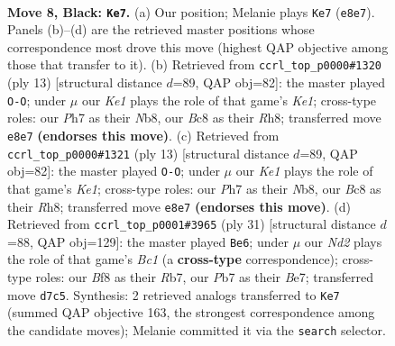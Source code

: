 \documentclass[11pt]{article}
\begin{document}
\begin{figure}[p]\centering
\begin{subfigure}{0.46\textwidth}\centering
\resizebox{\linewidth}{!}{%
\newchessgame
\chessboard[
  setfen={r1bqkb1r/pp1n1ppp/2n1p3/3pP3/3P2Q1/3B4/PP1N1PPP/R1B1K1NR b KQkq - 0 8},
  showmover=false,
  pgfstyle=straightmove, color=movearrow, markmove={e8-e7}
]}
\caption{}
\end{subfigure}\hfill
\begin{subfigure}{0.46\textwidth}\centering
\resizebox{\linewidth}{!}{%
\newchessgame
\chessboard[
  setfen={rnbqk2r/pp2nppp/4p3/2ppP3/3P2Q1/P1P5/2P2PPP/R1B1KBNR b KQkq - 2 7},
  showmover=false,
  pgfstyle=straightmove, color=movearrow, markmove={e8-g8}
]}
\caption{}
\end{subfigure}
\\[4pt]
\begin{subfigure}{0.46\textwidth}\centering
\resizebox{\linewidth}{!}{%
\newchessgame
\chessboard[
  setfen={rnbqk2r/pp2nppp/4p3/2ppP3/3P2Q1/P1P5/2P2PPP/R1B1KBNR b KQkq - 2 7},
  showmover=false,
  pgfstyle=straightmove, color=movearrow, markmove={e8-g8}
]}
\caption{}
\end{subfigure}\hfill
\begin{subfigure}{0.46\textwidth}\centering
\resizebox{\linewidth}{!}{%
\newchessgame
\chessboard[
  setfen={2bqk2r/1r2bpp1/p2p1n1p/4p3/1p2P1P1/4BP2/PPPQN2P/1K1R1B1R b k - 3 16},
  showmover=false,
  pgfstyle=straightmove, color=movearrow, markmove={c8-e6}
]}
\caption{}
\end{subfigure}
\caption{\textbf{Move 8, Black: \texttt{Ke7}.} (a) Our position; Melanie plays \texttt{Ke7} (\texttt{e8e7}). Panels (b)--(d) are the retrieved master positions whose correspondence most drove this move (highest QAP objective among those that transfer to it). (b) Retrieved from \texttt{ccrl\_top\_p0000\#1320} (ply 13) [structural distance $d$=89, QAP obj=82]: the master played \texttt{O-O}; under $\mu$ our \emph{Ke1} plays the role of that game's \emph{Ke1}; cross-type roles: our \emph{P}h7 as their \emph{N}b8, our \emph{B}c8 as their \emph{R}h8; transferred move \texttt{e8e7} \textbf{(endorses this move)}. (c) Retrieved from \texttt{ccrl\_top\_p0000\#1321} (ply 13) [structural distance $d$=89, QAP obj=82]: the master played \texttt{O-O}; under $\mu$ our \emph{Ke1} plays the role of that game's \emph{Ke1}; cross-type roles: our \emph{P}h7 as their \emph{N}b8, our \emph{B}c8 as their \emph{R}h8; transferred move \texttt{e8e7} \textbf{(endorses this move)}. (d) Retrieved from \texttt{ccrl\_top\_p0001\#3965} (ply 31) [structural distance $d$=88, QAP obj=129]: the master played \texttt{Be6}; under $\mu$ our \emph{Nd2} plays the role of that game's \emph{Bc1} (a \textbf{cross-type} correspondence); cross-type roles: our \emph{B}f8 as their \emph{R}b7, our \emph{P}b7 as their \emph{B}e7; transferred move \texttt{d7c5}. Synthesis: 2 retrieved analogs transferred to \texttt{Ke7} (summed QAP objective 163, the strongest correspondence among the candidate moves); Melanie committed it via the \texttt{search} selector.}
\label{fig:thought-m15}
\end{figure}
\end{document}
